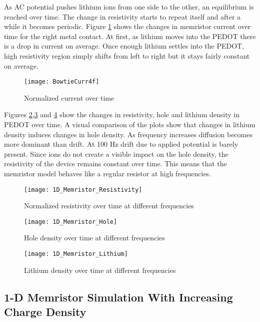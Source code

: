 \begin{doublespace}
As AC potential pushes lithium ions from one side to the other, an equilibrium is reached over time. The change in resistivity starts to repeat itself and after a while it becomes  periodic. Figure \ref{BowtieCurr} shows the changes in memristor current over time for the right metal contact. At first, as lithium moves into the PEDOT there is a drop in current on average. Once enough lithium settles into the PEDOT, high resistivity region simply shifts from left to right but it stays fairly constant on average. 

\begin{figure}[!htp]
\centering
\texttt{[image: BowtieCurr4f]}
\caption{Normalized current over time} 
\label{BowtieCurr}
\end{figure}

Figures \ref{BowtieRes},\ref{Bowhole} and \ref{Bowli} show the changes in resistivity, hole and lithium density in PEDOT over time. A visual comparison of the plots show that changes in lithium density induces changes in hole density. As frequency increases diffusion becomes more dominant than drift. At 100 Hz drift due to applied potential is barely present. Since ions do not create a visible impact on the hole density, the resistivity of the device remains constant over time. This means that the memristor model behaves like a regular resistor at high frequencies.

\begin{figure}[!htp]
\centering
\texttt{[image: 1D\_Memristor\_Resistivity]}
\caption{Normalized resistivity over time at different frequencies} 
\label{BowtieRes}
\end{figure}

\begin{figure}[!htp]
\centering
\texttt{[image: 1D\_Memristor\_Hole]}
\caption{Hole density over time at different frequencies} 
\label{Bowhole}
\end{figure}



\begin{figure}[!htp]
\centering
\texttt{[image: 1D\_Memristor\_Lithium]}
\caption{Lithium density over time at different frequencies} 
\label{Bowli}
\end{figure}




\clearpage
\subsection{1-D Memristor Simulation With Increasing Charge Density}


\end{doublespace}
